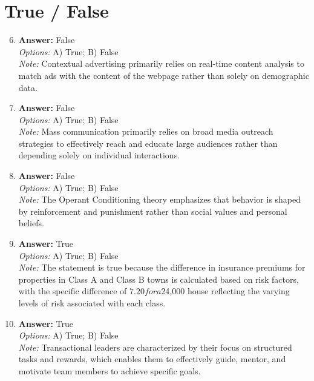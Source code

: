 \documentclass[12pt]{article}
\begin{document}
\section*{True / False}
\begin{enumerate}[label=\arabic*.]
\setcounter{enumi}{5}
\item \textbf{Answer:} False
\\ \textit{Options:} A) True; B) False
\\ \textit{Note:} Contextual advertising primarily relies on real-time content analysis to match ads with the content of the webpage rather than solely on demographic data.
\item \textbf{Answer:} False
\\ \textit{Options:} A) True; B) False
\\ \textit{Note:} Mass communication primarily relies on broad media outreach strategies to effectively reach and educate large audiences rather than depending solely on individual interactions.
\item \textbf{Answer:} False
\\ \textit{Options:} A) True; B) False
\\ \textit{Note:} The Operant Conditioning theory emphasizes that behavior is shaped by reinforcement and punishment rather than social values and personal beliefs.
\item \textbf{Answer:} True
\\ \textit{Options:} A) True; B) False
\\ \textit{Note:} The statement is true because the difference in insurance premiums for properties in Class A and Class B towns is calculated based on risk factors, with the specific difference of $7.20 for a $24,000 house reflecting the varying levels of risk associated with each class.
\item \textbf{Answer:} True
\\ \textit{Options:} A) True; B) False
\\ \textit{Note:} Transactional leaders are characterized by their focus on structured tasks and rewards, which enables them to effectively guide, mentor, and motivate team members to achieve specific goals.
\end{enumerate}
\end{document}
